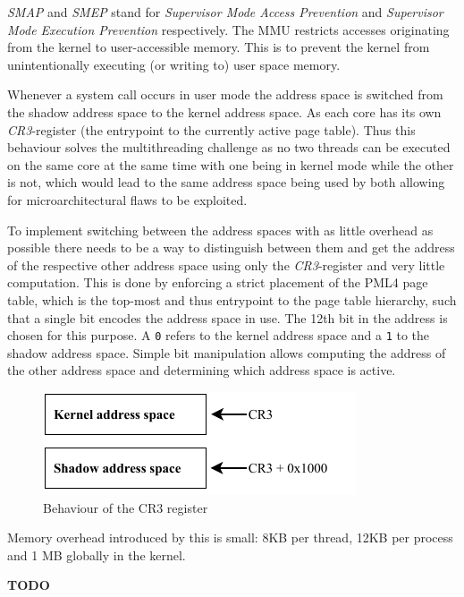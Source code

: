 \textit{SMAP} and \textit{SMEP} stand for \textit{Supervisor Mode Access Prevention} and \textit{Supervisor Mode Execution Prevention} respectively.
The MMU restricts accesses originating from the kernel to user-accessible memory.
This is to prevent the kernel from unintentionally executing (or writing to) user space memory.\cite{smap}

Whenever a system call occurs in user mode the address space is switched from the shadow address space to the kernel address space.
As each core has its own \textit{CR3}-register (the entrypoint to the currently active page table).
Thus this behaviour solves the multithreading challenge as no two threads can be executed on the same core at the same time with one being in kernel mode while the other is not, which would lead to the same address space being used by both allowing for microarchitectural flaws to be exploited.

To implement switching between the address spaces with as little overhead as possible there needs to be a way to distinguish between them and get the address of the respective other address space using only the \textit{CR3}-register and very little computation.
This is done by enforcing a strict placement of the PML4 page table, which is the top-most and thus entrypoint to the page table hierarchy, such that a single bit encodes the address space in use.
The 12th bit in the address is chosen for this purpose.
A \lstinline{0} refers to the kernel address space and a \lstinline{1} to the shadow address space.
Simple bit manipulation allows computing the address of the other address space and determining which address space is active.

\begin{figure}[h]
  \begin{center}
    \includegraphics[page=1,width=.3\textwidth]{fig/prebuilt_cr3-register}
  \end{center}
  \caption{Behaviour of the CR3 register}
  \label{fig:cr3-register}
\end{figure}

Memory overhead introduced by this is small: 8KB per thread, 12KB per process and 1 MB globally in the kernel.\cite{kaiser}

\textbf{TODO}
